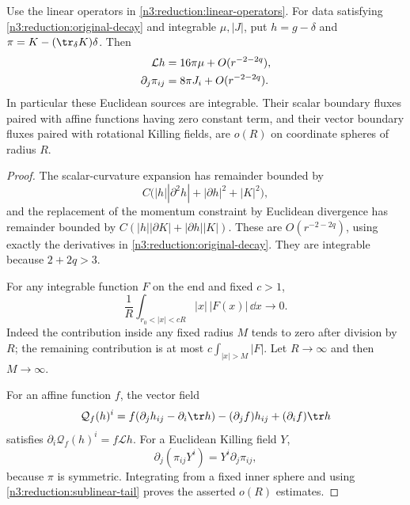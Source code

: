 \begin{lemma}
\label{n3:reduction:moment-estimates}
Use the linear operators in \eqref{n3:reduction:linear-operators}.
For data satisfying \eqref{n3:reduction:original-decay} and
integrable $\mu,|J|$, put $h=g-\delta$ and
$\pi=K-(\tr_\delta K)\delta$.  Then
\begin{align}
 \mathcal Lh&=16\pi\mu+O(r^{-2-2q}),\notag\\
 \partial_j\pi_{ij}&=8\pi J_i+O(r^{-2-2q}).
       \label{n3:reduction:linear-source-integrability}
\end{align}
In particular these Euclidean sources are integrable.  Their scalar
boundary fluxes paired with affine functions having zero constant term,
and their vector boundary fluxes paired with rotational Killing fields,
are $o(R)$ on coordinate spheres of radius $R$.
\end{lemma}

\begin{proof}
The scalar-curvature expansion has remainder bounded by
\[
 C\bigl(|h||\partial^2h|+|\partial h|^2+|K|^2\bigr),
\]
and the replacement of the momentum constraint by Euclidean divergence
has remainder bounded by
$C(|h||\partial K|+|\partial h||K|)$.  These are
$O(r^{-2-2q})$, using exactly the derivatives in
\eqref{n3:reduction:original-decay}.  They are integrable because
$2+2q>3$.

For any integrable function $F$ on the end and fixed $c>1$,
\begin{equation}
 \label{n3:reduction:sublinear-tail}
 \frac1R\int_{r_0<|x|<cR}|x|\,|F(x)|\,\dd x\longrightarrow0.
\end{equation}
Indeed the contribution inside any fixed radius $M$ tends to zero
after division by $R$; the remaining contribution is at most
$c\int_{|x|>M}|F|$.  Let $R\to\infty$ and then $M\to\infty$.

For an affine function $f$, the vector field
\[
 \mathcal Q_f(h)^i
  =f(\partial_jh_{ij}-\partial_i\tr h)
       -(\partial_jf)h_{ij}+(\partial_if)\tr h
\]
satisfies $\partial_i\mathcal Q_f(h)^i=f\mathcal Lh$.
For a Euclidean Killing field $Y$,
\[
 \partial_j(\pi_{ij}Y^i)=Y^i\partial_j\pi_{ij},
\]
because $\pi$ is symmetric.  Integrating from a fixed inner sphere and
using \eqref{n3:reduction:sublinear-tail} proves the asserted
$o(R)$ estimates.
\end{proof}

